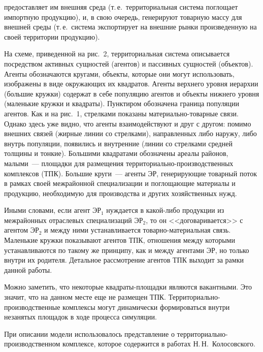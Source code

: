 \begin{multicols}{2}
\bigskip
\addtocounter{figure}{1}
     
     \noindent 
предо\-став\-ля\-ет им внешняя среда (т.\,е.\ территориальная система поглощает 
импортную продукцию), и, в свою очередь, генерируют товарную массу для 
внешней среды (т.\,е.\ система экспортирует на внешние рынки произведенную 
на своей территории продукцию).

 
     
  На схеме, приведенной на рис.~2, территориальная система описывается 
посредством активных сущностей (агентов) и пассивных сущностей (объектов). 
Агенты обозначаются кругами, объекты, которые они могут использовать, 
изображены в виде окружающих их квадратов. Агенты верхнего уровня 
иерархии (большие кружки) содержат в себе популяцию агентов и объекты 
нижнего уровня (маленькие кружки и квадраты). Пунктиром обозначена 
граница популяции агентов. Как и на рис.~1, стрелками показаны ма\-те\-ри\-аль\-но-то\-вар\-ные 
связи. Однако здесь уже видно, что агенты взаимодействуют и друг с 
другом: помимо внешних связей (жирные линии со стрелками), направленных 
либо наружу, либо внутрь популяции, появились и внутренние (линии со 
стрелками средней толщины и тонкие). Большими квадратами обозначены 
ареалы районов, малыми~--- площадки для размещения тер\-ри\-то\-ри\-аль\-но-про\-из\-вод\-ст\-вен\-ных 
комплексов (ТПК). Большие круги~--- агенты ЭР, 
генерирующие товарный поток в рамках своей межрайонной специализации и 
поглощающие материалы и продукцию, необходимую для производства и 
других хозяйственных нужд.
  
  
  Иными словами, если агент ЭР$_1$ нуждается в какой-либо продукции из 
межрайонных отраслевых специализаций ЭР$_2$, то он <<договаривается>> с 
агентом ЭР$_2$ и между ними устанавливается то\-вар\-но-ма\-те\-ри\-а\-ль\-ная 
связь. Маленькие кружки показывают агентов ТПК, отношения между 
которыми устанавливаются по такому же принципу, как и между агентами ЭР, 
но только внутри их родителя. Детальное рассмотрение агентов ТПК выходит 
за рамки данной работы.
  
  Можно заметить, что некоторые квадраты-пло\-щад\-ки являются вакантными. 
Это значит, что на данном месте еще не размещен ТПК. Тер\-ри\-то\-ри\-аль\-но-про\-из\-вод\-ст\-вен\-ные 
комплексы могут  динамически формироваться внутри незанятых площадок в ходе процесса 
симуляции. 
  
  При описании модели использовалось пред\-став\-ле\-ние о 
  тер\-ри\-то\-ри\-аль\-но-про\-из\-вод\-ст\-вен\-ном комплексе, которое 
содержится в работах Н.\,Н.~Колосовского. 
  

\end{multicols}
